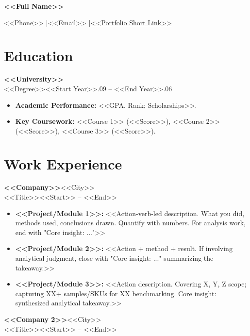 \documentclass[a4paper, 10pt]{article}
\newcommand{\workentry}[4]{%
  \noindent\textbf{#1}\hfill{\small #2}\\[-2pt]
  {\small #3}\hfill{\small #4}\par\vspace{1.5pt}%
}
\begin{document}
\noindent
\begin{minipage}{\textwidth}
  \centering
  {\Large\bfseries <<Full Name>>\par}
  \vspace{2pt}
  {\small <<Phone>> \enspace|\enspace <<Email>> \enspace|\enspace \href{<<Portfolio URL>>}{<<Portfolio Short Link>>}\par}
\end{minipage}

\vspace{2pt}

\section{Education}

\workentry{<<University>>}{}{<<Degree>>}{<<Start Year>>.09 -- <<End Year>>.06}

\begin{itemize}
  \item \textbf{Academic Performance:} <<GPA, Rank; Scholarships>>.
  \item \textbf{Key Coursework:} <<Course 1>> (<<Score>>), <<Course 2>> (<<Score>>), <<Course 3>> (<<Score>>).
\end{itemize}

\section{Work Experience}

\workentry{<<Company>>}{<<City>>}{<<Title>>}{<<Start>> -- <<End>>}

\begin{itemize}
  \item \textbf{<<Project/Module 1>>:} <<Action-verb-led description. What you did, methods used, conclusions drawn. Quantify with numbers. For analysis work, end with "Core insight: ...">>
  \item \textbf{<<Project/Module 2>>:} <<Action + method + result. If involving analytical judgment, close with "Core insight: ..." summarizing the takeaway.>>
  \item \textbf{<<Project/Module 3>>:} <<Action description. Covering X, Y, Z scope; capturing XX+ samples/SKUs for XX benchmarking. Core insight: synthesized analytical takeaway.>>
\end{itemize}

\workentry{<<Company 2>>}{<<City>>}{<<Title>>}{<<Start>> -- <<End>>}
\end{document}
